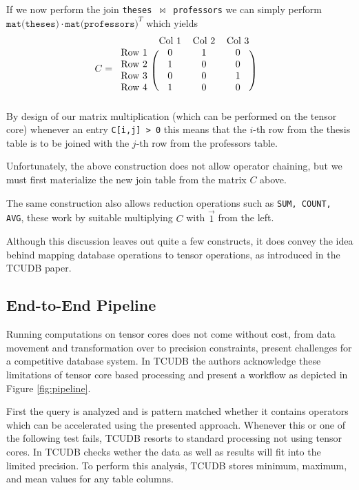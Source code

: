 \documentclass{paper}
\begin{document}
	If we now perform the join \texttt{theses $\Join$ professors} we can simply perform $\texttt{mat(theses)} \cdot \texttt{mat(professors)}^T$ which yields 
	\begin{align*} C&=
		\begin{blockarray}{cccc} 
			& \text{Col 1} & \text{Col 2} & \text{Col 3} \\
			\begin{block}{c(ccc)}
				\text{Row 1} & 0 & 1 & 0 \\
				\text{Row 2} & 1 & 0 & 0 \\
				\text{Row 3} & 0 & 0 & 1 \\
				\text{Row 4} & 1 & 0 & 0 \\
			\end{block}
		\end{blockarray}
	\end{align*}	
	By design of our matrix multiplication (which can be performed on the tensor core) whenever an entry \allowbreak \texttt{C[i,j] > 0} this means that the $i$-th row from the thesis table is to be joined with the $j$-th row from the professors table.
	
	Unfortunately, the above construction does not allow operator chaining, but we must first materialize the new join table from the matrix $C$ above.
	
	The same construction also allows reduction operations such as \texttt{SUM, COUNT, AVG}, these work by suitable multiplying $C$ with $\vec{1}$ from the left.
	
	Although this discussion leaves out quite a few constructs, it does convey the idea behind mapping \allowbreak database operations to tensor operations, as introduced in the TCUDB paper.
	
	\subsection{End-to-End Pipeline}
	
	Running computations on tensor cores does not come without cost, from data movement and transformation over to precision constraints, present challenges for a competitive database system. In TCUDB the authors acknowledge these limitations of tensor core \allowbreak based processing and present a workflow as depicted in Figure \ref{fig:pipeline}.
	
	First the query is analyzed  and is pattern matched whether it contains operators which can be accelerated using the presented approach. Whenever this or one of the following test fails, TCUDB resorts to standard processing not using tensor cores. In  TCUDB checks wether the data as well as results will fit into the limited precision. To perform this analysis, TCUDB stores minimum, maximum, and mean values for any table columns.
	
\end{document}
